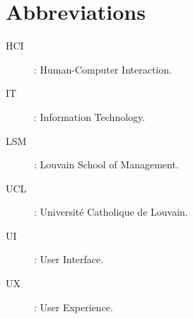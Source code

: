 \chapter{Abbreviations}
\begin{description}
  \item[HCI]: Human-Computer Interaction.
  \item[IT]: Information Technology.
  \item[LSM]: Louvain School of Management.
  \item[UCL]: Université Catholique de Louvain.
  \item[UI]: User Interface.
  \item[UX]: User Experience.
\end{description}